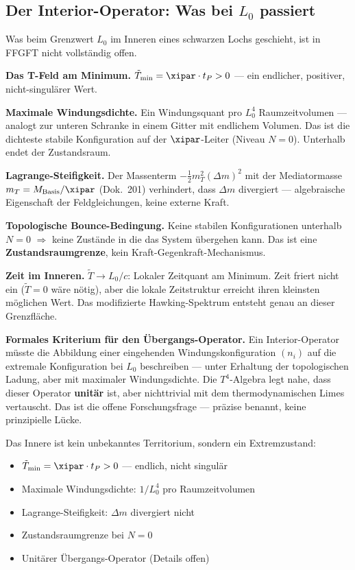 \subsection{Der Interior-Operator: Was bei $L_0$ passiert}

Was beim Grenzwert $L_0$ im Inneren eines schwarzen Lochs geschieht, ist in FFGFT nicht vollständig offen.

\textbf{Das T-Feld am Minimum.}
$\tilde{T}_\text{min} = \xipar \cdot t_P > 0$ --- ein endlicher, positiver, nicht-singulärer Wert.

\textbf{Maximale Windungsdichte.}
Ein Windungsquant pro $L_0^4$ Raumzeitvolumen --- analogt zur unteren Schranke in einem Gitter mit endlichem Volumen. Das ist die dichteste stabile Konfiguration auf der $\xipar$-Leiter (Niveau $N = 0$). Unterhalb endet der Zustandsraum.

\textbf{Lagrange-Steifigkeit.}
Der Massenterm $-\frac{1}{2}m_T^2(\Delta m)^2$ mit der Mediatormasse $m_T = M_\mathrm{Basis}/\xipar$ (Dok.~201) verhindert, dass $\Delta m$ divergiert --- algebraische Eigenschaft der Feldgleichungen, keine externe Kraft.

\textbf{Topologische Bounce-Bedingung.}
Keine stabilen Konfigurationen unterhalb $N = 0$ $\Rightarrow$ keine Zustände in die das System übergehen kann. Das ist eine \textbf{Zustandsraumgrenze}, kein Kraft-Gegenkraft-Mechanismus.

\textbf{Zeit im Inneren.}
$\tilde{T} \rightarrow L_0/c$: Lokaler Zeitquant am Minimum. Zeit friert nicht ein ($\tilde{T} = 0$ wäre nötig), aber die lokale Zeitstruktur erreicht ihren kleinsten möglichen Wert. Das modifizierte Hawking-Spektrum entsteht genau an dieser Grenzfläche.

\textbf{Formales Kriterium für den Übergangs-Operator.}
Ein Interior-Operator müsste die Abbildung einer eingehenden Windungskonfiguration $(n_i)$ auf die extremale Konfiguration bei $L_0$ beschreiben --- unter Erhaltung der topologischen Ladung, aber mit maximaler Windungsdichte. Die $T^4$-Algebra legt nahe, dass dieser Operator \textbf{unitär} ist, aber nichttrivial mit dem thermodynamischen Limes vertauscht. Das ist die offene Forschungsfrage --- präzise benannt, keine prinzipielle Lücke.

\begin{erkenntnis}
Das Innere ist kein unbekanntes Territorium, sondern ein Extremzustand:
\begin{itemize}
  \item $\tilde{T}_\text{min} = \xipar \cdot t_P > 0$ --- endlich, nicht singulär
  \item Maximale Windungsdichte: $1/L_0^4$ pro Raumzeitvolumen
  \item Lagrange-Steifigkeit: $\Delta m$ divergiert nicht
  \item Zustandsraumgrenze bei $N = 0$
  \item Unitärer Übergangs-Operator (Details offen)
\end{itemize}
\end{erkenntnis}

